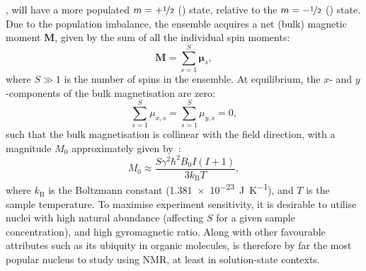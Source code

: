 , will have a more populated $m = +\nicefrac{1}{2}$ (\textalpha) state,
relative to the $m = -\nicefrac{1}{2}$ (\textbeta) state.  Due to the
population imbalance, the ensemble acquires a net (bulk) magnetic moment
$\symbf{M}$, given by the sum of all the individual spin moments:
\begin{equation}
    \symbf{M} = \sum\limits_{s=1}^{S} \symbf{\mu}_s,
\end{equation}
where $S \gg 1$ is the number of spins in the ensemble.
At equilibrium, the $x$- and $y$-components of the bulk magnetisation are zero:
\begin{equation}
    \sum_{s=1}^{S} \mu_{x,s} = \sum_{s=1}^{S} \mu_{y,s} = 0,
\end{equation}
such that the bulk magnetisation is collinear with the field direction, with a
magnitude $M_0$ approximately given by~\cite[Section 1.1]{Cavanagh2007}:
\begin{equation}
    M_0 \approx \frac{S \gamma^2 \hbar^2 B_0 I (I + 1)}{3 k_{\text{B}} T},
\end{equation}
where $k_{\text{B}}$ is the Boltzmann constant
(\qty{1.381e-23}{\joule\per\kelvin}),
and $T$ is the sample temperature. To maximise experiment sensitivity, it is
desirable to
utilise nuclei with high natural abundance (affecting $S$ for a given sample
concentration), and high
gyromagnetic ratio. Along with other favourable attributes such as its ubiquity
in organic molecules,  is therefore by far the most popular nucleus to
study using \ac{NMR}, at least in solution-state contexts.

